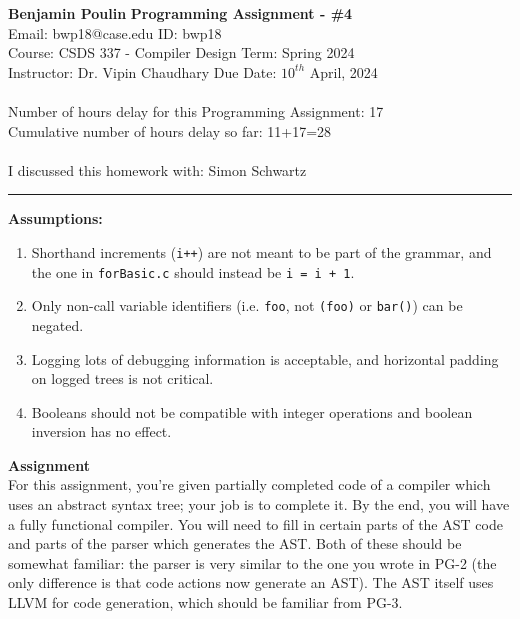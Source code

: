 \documentclass[a4paper, 11pt]{article}
\begin{document}
\noindent
\large\textbf{Benjamin Poulin} \hfill \textbf{Programming Assignment - \#4}   \\
Email: bwp18@case.edu \hfill ID: bwp18 \\
\normalsize Course: CSDS 337 - Compiler Design \hfill Term: Spring 2024\\
Instructor: Dr. Vipin Chaudhary \hfill Due Date: $10^{th}$ April, 2024 \\ \\
Number of hours delay for this Programming Assignment: \hfill 17\\
Cumulative number of hours delay so far: \hfill 11+17=28 \\ \\
I discussed this homework with: \hfill Simon Schwartz \\
\noindent\rule{7in}{2.8pt}



\large\textbf{Assumptions:}

\begin{enumerate}
    \item Shorthand increments (\verb|i++|) are not meant to be part of the grammar, and the one in \verb|forBasic.c| should instead be \verb|i = i + 1|.
    \item Only non-call variable identifiers (i.e. \verb|foo|, not \verb|(foo)| or \verb|bar()|) can be negated.
    \item Logging lots of debugging information is acceptable, and horizontal padding on logged trees is not critical.
    \item Booleans should not be compatible with integer operations and boolean inversion has no effect.
\end{enumerate}

\large\textbf{Assignment} \\
For this assignment, you're given partially completed code of a compiler which uses an abstract syntax tree; your job is to complete it. By the end, you will have a fully functional compiler. You will need to fill in certain parts of the AST code and parts of the parser which generates the AST. Both of these should be somewhat familiar: the parser is very similar to the one you wrote in PG-2 (the only difference is that code actions now generate an AST). The AST itself uses LLVM for code generation, which should be familiar from PG-3.
\end{document}
